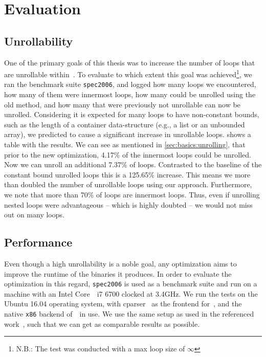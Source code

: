 \chapter{Evaluation}\label{sec:eval}

\section{Unrollability}\label{sec:eval:unrollability}

One of the primary goals of this thesis was to increase the number of loops that are unrollable within~\libFIRM.
To evaluate to which extent this goal was achieved\footnote{N.B.: The test was conducted with a max loop size of $\infty$}, we ran the benchmark suite \texttt{spec2006}, and logged how many loops we encountered, how many of them were innermost loops, how many could be unrolled using the old method, and how many that were previously not unrollable can now be unrolled.
Considering it is expected for many loops to have non-constant bounds, such as the length of a container data-structure (e.g., a list or an unbounded array), we predicted to cause a significant increase in unrollable loops.
 shows a table with the results.
We can see as mentioned in \cref{sec:basics:unrolling}, that prior to the new optimization, 4.17\% of the innermost loops could be unrolled.
Now we can unroll an additional 7.37\% of loops.
Contrasted to the baseline of the constant bound unrolled loops this is a 125.65\% increase.
This means we more than doubled the number of unrollable loops using our approach.
Furthermore, we note that more than 70\% of loops are innermost loops.
Thus, even if unrolling nested loops were advantageous -- which is highly doubted -- we would not miss out on many loops.



\section{Performance}\label{sec:eval:perf}

Even though a high unrollability is a noble goal, any optimization aims to improve the runtime of the binaries it produces.
In order to evaluate the optimization in this regard, \texttt{spec2006} is used as a benchmark suite and run on a machine with an Intel Core~\textregistered~i7 6700 clocked at 3.4GHz.
We run the tests on the Ubuntu 16.04 operating system, with cparser~\cite{cparser} as the frontend for~\libFIRM, and the native \texttt{x86} backend of~\libFIRM~in use.
We use the same setup as used in the referenced work~\cite{aebi18bachelorarbeit}, such that we can get as comparable results as possible.

